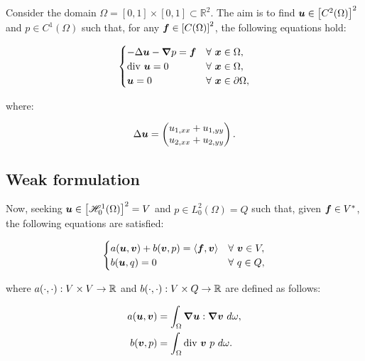 Consider the domain $\Omega = [0, 1] \times [0, 1] \subset \mathbb{R}^2$. The aim is to find $\bm{u} \in \left[ C^2(\Omega) \right]^2$ and $p \in C^1(\Omega)$ such that, for any $\bm{f} \in \left[ C(\Omega) \right]^2$, the following equations hold:

\begin{gather}
    \begin{cases} \label{strong_stokes}
        - \Delta \bm{u} - \bm{\nabla} p = \bm{f} & \forall ~ \bm{x} \in \Omega, \\
        \text{div } \bm{u} = 0 & \forall ~ \bm{x} \in \Omega, \\
        \bm{u} = 0 & \forall ~ \bm{x} \in \partial \Omega,
    \end{cases}
\end{gather}

where:

\begin{gather}
    \Delta \bm{u} = \begin{pmatrix}
        u_{1, xx} + u_{1, yy} \\
        u_{2, xx} + u_{2, yy}
    \end{pmatrix} .
\end{gather}

\subsection{Weak formulation}

Now, seeking $\bm{u} \in \left[ \mathscr{H}^1_0(\Omega) \right]^2 = V$ and $p \in L^2_0(\Omega) = Q$ such that, given $\bm{f} \in V^*$, the following equations are satisfied:

\begin{gather} \label{weak_stokes}
    \begin{cases}
        a(\bm{u}, \bm{v}) + b(\bm{v}, p) = \langle \bm{f}, \bm{v} \rangle & \forall ~ \bm{v} \in V,\\
        b(\bm{u}, q) = 0 & \forall ~ q \in Q,
    \end{cases}
\end{gather}

where $a(\cdot, \cdot): V \times V \rightarrow \mathbb{R}$ and $b(\cdot, \cdot): V \times Q \rightarrow \mathbb{R}$ are defined as follows:

\begin{align}
    a(\bm{u}, \bm{v}) &= \int_{\Omega} \bm{\nabla} \bm{u} : \bm{\nabla} \bm{v} ~ d \omega, \label{a} \\
    b(\bm{v}, p) &= \int_{\Omega} \text{div } \bm{v} ~ p ~ d \omega. \label{b}
\end{align}

